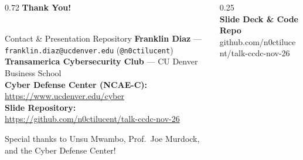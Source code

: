 \documentclass[aspectratio=169,11pt,xcolor={table,dvipsnames}]{beamer}
\begin{document}
\begin{frame}[plain]
  \vfill
  \begin{columns}[c]
    \begin{column}{0.72\textwidth}
      {\Huge\bfseries\textcolor{accentcyan}{Thank You!}}\\[0.25cm]
      {\Large\textcolor{white}{Questions, Live Demos, \& Gallery Submissions}}\\[0.5cm]

      \begin{block}{Contact \& Presentation Repository}
        \small
        \textbf{Franklin Diaz} --- \texttt{franklin.diaz@ucdenver.edu} \quad (\texttt{@n0ctilucent}) \\
        \textbf{Transamerica Cybersecurity Club} --- CU Denver Business School \\
        \textbf{Cyber Defense Center (NCAE-C):} \url{https://www.ucdenver.edu/cyber} \\
        \textbf{Slide Repository:} \url{https://github.com/n0ctilucent/talk-ccdc-nov-26}
      \end{block}

      \vspace{0.3cm}
      {\footnotesize \textcolor{textmuted}{Special thanks to Unsu Mwambo, Prof.\ Joe Murdock, and the Cyber Defense Center!}}
    \end{column}
    \begin{column}{0.25\textwidth}
      \centering
      \colorbox{white}{}\\[0.2cm]
      {\tiny \textcolor{accentcyan}{\textbf{Slide Deck \& Code Repo}}}\\
      {\tiny \textcolor{textmuted}{github.com/n0ctilucent/talk-ccdc-nov-26}}
    \end{column}
  \end{columns}
  \vfill
\end{frame}
\end{document}
